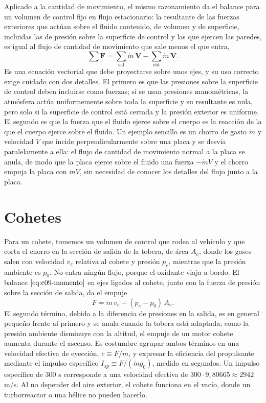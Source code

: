 \documentclass[10pt,openany]{book}
\begin{document}
Aplicado a la cantidad de movimiento, el mismo razonamiento da el balance para un volumen de control fijo en flujo estacionario: la resultante de las fuerzas exteriores que actúan sobre el fluido contenido, de volumen y de superficie, incluidas las de presión sobre la superficie de control y las que ejercen las paredes, es igual al flujo de cantidad de movimiento que sale menos el que entra,
\begin{equation}
\sum \mathbf{F} = \sum_{\mathrm{sal}} \dot m\,\mathbf{V} - \sum_{\mathrm{ent}} \dot m\,\mathbf{V}. \label{eq:c09-momento}
\end{equation}
Es una ecuación vectorial que debe proyectarse sobre unos ejes, y su uso correcto exige cuidado con dos detalles. El primero es que las presiones sobre la superficie de control deben incluirse como fuerzas; si se usan presiones manométricas, la atmósfera actúa uniformemente sobre toda la superficie y su resultante es nula, pero solo si la superficie de control está cerrada y la presión exterior es uniforme. El segundo es que la fuerza que el fluido ejerce sobre el cuerpo es la reacción de la que el cuerpo ejerce sobre el fluido. Un ejemplo sencillo es un chorro de gasto \(\dot m\) y velocidad \(V\) que incide perpendicularmente sobre una placa y se desvía paralelamente a ella: el flujo de cantidad de movimiento normal a la placa se anula, de modo que la placa ejerce sobre el fluido una fuerza \(-\dot m V\) y el chorro empuja la placa con \(\dot m V\), sin necesidad de conocer los detalles del flujo junto a la placa.

\section{Cohetes}

Para un cohete, tomemos un volumen de control que rodea al vehículo y que corta el chorro en la sección de salida de la tobera, de área \(A_e\), donde los gases salen con velocidad \(v_e\) relativa al cohete y presión \(p_e\), mientras que la presión ambiente es \(p_0\). No entra ningún flujo, porque el oxidante viaja a bordo. El balance \(\eqref{eq:c09-momento}\) en ejes ligados al cohete, junto con la fuerza de presión sobre la sección de salida, da el empuje
\begin{equation}
F = \dot m\,v_e + (p_e - p_0)\,A_e. \label{eq:c09-cohete}
\end{equation}
El segundo término, debido a la diferencia de presiones en la salida, es en general pequeño frente al primero y se anula cuando la tobera está adaptada; como la presión ambiente disminuye con la altitud, el empuje de un motor cohete aumenta durante el ascenso. Es costumbre agrupar ambos términos en una velocidad efectiva de eyección, \(c \equiv F/\dot m\), y expresar la eficiencia del propulsante mediante el impulso específico \(I_{sp} \equiv F/(\dot m g_0)\), medido en segundos. Un impulso específico de 300 s corresponde a una velocidad efectiva de \(300\cdot 9{,}80665 \approx 2942\) m/s. Al no depender del aire exterior, el cohete funciona en el vacío, donde un turborreactor o una hélice no pueden hacerlo.
\end{document}
